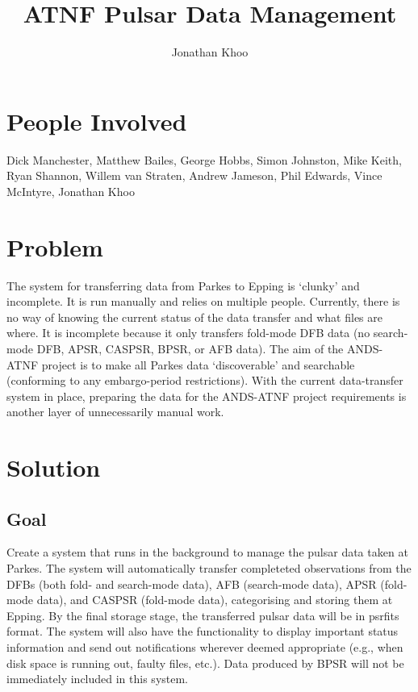 \documentclass{article}
\begin{document}
\title{ATNF Pulsar Data Management}
\author{Jonathan Khoo}
\date{}
\maketitle

\section{People Involved}
Dick Manchester, Matthew Bailes, George Hobbs, Simon Johnston, Mike Keith, Ryan Shannon, Willem van Straten, Andrew Jameson, Phil Edwards, Vince McIntyre, Jonathan Khoo

\section{Problem}
The system for transferring data from Parkes to Epping is `clunky' and incomplete. It is run manually and relies on multiple people. Currently, there is no way of knowing the current status of the data transfer and what files are where. It is incomplete because it only transfers fold-mode DFB data (no search-mode DFB, APSR, CASPSR, BPSR, or AFB data). The aim of the ANDS-ATNF project is to make all Parkes data `discoverable' and searchable (conforming to any embargo-period restrictions). With the current data-transfer system in place, preparing the data for the ANDS-ATNF project requirements is another layer of unnecessarily manual work.

\section{Solution}
\subsection{Goal}
Create a system that runs in the background to manage the pulsar data taken at Parkes. The system will automatically transfer completeted observations from the DFBs (both fold- and search-mode data), AFB (search-mode data), APSR (fold-mode data), and CASPSR (fold-mode data), categorising and storing them at Epping. By the final storage stage, the transferred pulsar data will be in psrfits format. The system will also have the functionality to display important status information and send out notifications wherever deemed appropriate (e.g., when disk space is running out, faulty files, etc.). Data produced by BPSR will not be immediately included in this system.
\end{document}
